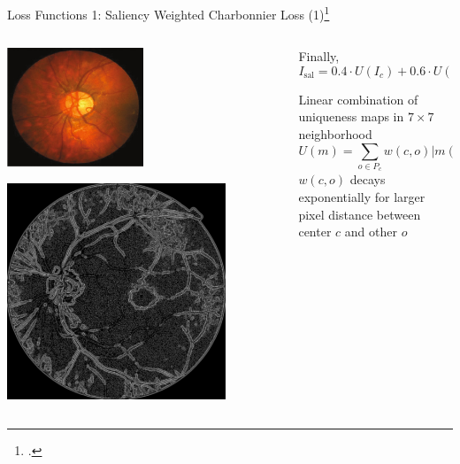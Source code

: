 \documentclass{beamer}
\begin{document}
\begin{frame}{Loss Functions 1: Saliency Weighted Charbonnier Loss (1)\footcite{SaliencyGAN}}
\begin{columns}
  \begin{column}{0.5\linewidth}
      \centering
      \includegraphics[width=0.5\textwidth]{saliency_gt}

      \includegraphics[width=0.8\textwidth]{saliency_full}
  \end{column}
  \begin{column}{0.6\linewidth}

Finally,
\begin{equation}
  \label{eq:saliency}
  I_{\text{sal}} = 0.4 \cdot U(I_c) + 0.6 \cdot U(1 - I_e)
\end{equation}

Linear combination of uniqueness  maps in $7 \times 7$ neighborhood
 \begin{equation}
  \label{eq:uniq}
  U(m) = \sum_{o \in P_c} w(c, o) \vert m(c) - m(o) \vert,
\end{equation}
$w(c, o)$ decays exponentially for larger pixel distance between center $c$ and other $o$ 

\end{column} 
\end{columns}
\end{frame}
\end{document}
